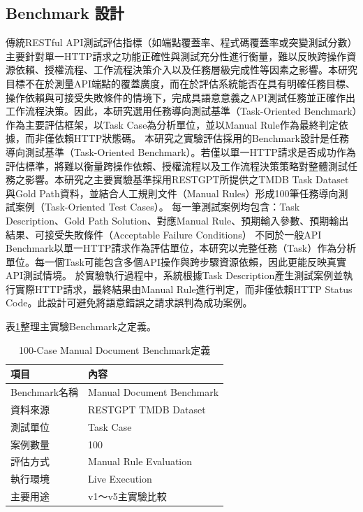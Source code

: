 \begin{ZhChapter}
\section{Benchmark 設計}
\text 傳統RESTful API測試評估指標（如端點覆蓋率、程式碼覆蓋率或突變測試分數）主要針對單一HTTP請求之功能正確性與測試充分性進行衡量，難以反映跨操作資源依賴、授權流程、工作流程決策介入以及任務層級完成性等因素之影響。本研究目標不在於測量API端點的覆蓋廣度，而在於評估系統能否在具有明確任務目標、操作依賴與可接受失敗條件的情境下，完成具語意意義之API測試任務並正確作出工作流程決策。因此，本研究選用任務導向測試基準（Task-Oriented Benchmark）作為主要評估框架，以Task Case為分析單位，並以Manual Rule作為最終判定依據，而非僅依賴HTTP狀態碼。
\text 本研究之實驗評估採用的Benchmark設計是任務導向測試基準（Task-Oriented Benchmark）。若僅以單一HTTP請求是否成功作為評估標準，將難以衡量跨操作依賴、授權流程以及工作流程決策策略對整體測試任務之影響。本研究之主要實驗基準採用RESTGPT所提供之TMDB Task Dataset與Gold Path資料，並結合人工規則文件（Manual Rules）形成100筆任務導向測試案例（Task-Oriented Test Cases）。
\text 每一筆測試案例均包含：Task Description、Gold Path Solution、對應Manual Rule、預期輸入參數、預期輸出結果、可接受失敗條件（Acceptable Failure Conditions）
\text 不同於一般API Benchmark以單一HTTP請求作為評估單位，本研究以完整任務（Task）作為分析單位。每一個Task可能包含多個API操作與跨步驟資源依賴，因此更能反映真實API測試情境。
\text 於實驗執行過程中，系統根據Task Description產生測試案例並執行實際HTTP請求，最終結果由Manual Rule進行判定，而非僅依賴HTTP Status Code。此設計可避免將語意錯誤之請求誤判為成功案例。

表\ref{tab:manual_doc_benchmark_definition}整理主實驗Benchmark之定義。

\begin{table}[H]
\centering
\caption{100-Case Manual Document Benchmark定義}
\label{tab:manual_doc_benchmark_definition}
\renewcommand{\arraystretch}{1.3}
\begin{tabular}{p{4cm} p{8cm}}
\toprule
\textbf{項目} & \textbf{內容} \\
\midrule
Benchmark名稱 & Manual Document Benchmark \\
資料來源 & RESTGPT TMDB Dataset \\
測試單位 & Task Case \\
案例數量 & 100 \\
評估方式 & Manual Rule Evaluation \\
執行環境 & Live Execution \\
主要用途 & v1～v5主實驗比較 \\
\bottomrule
\end{tabular}
\end{table}


\end{ZhChapter}
